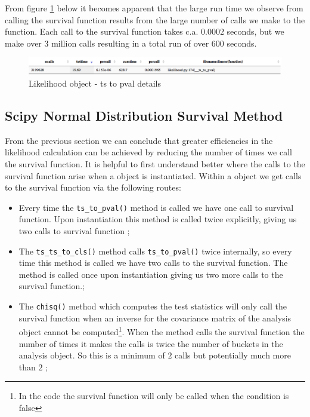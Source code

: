 From figure \ref{fig:ts_to_pval} below it becomes apparent that the large run time we observe from calling the survival function results from the large number of calls we make to the function. Each call to the survival function takes c.a. $0.0002$ seconds, but we make over $3$ million calls resulting in a total run of over $600$ seconds. 

\begin{figure}[H]
\centering
\includegraphics[scale=0.3]{plots/likelihood_count.png}
\caption{Likelihood object - ts to pval details}
\label{fig:ts_to_pval}
\end{figure}

\subsection{Scipy Normal Distribution Survival Method}
From the previous section we can conclude that greater efficiencies in the likelihood calculation can be achieved by reducing the number of times we call the survival function. It is helpful to first understand better where the calls to the survival function arise when a  object is instantiated. Within a  object we get calls to the survival function via the following routes:

\begin{itemize}
\item[1.] Every time the \texttt{ts\_to\_pval()} method is called we have one call to survival function. Upon instantiation this method is called twice explicitly, giving us two calls to survival function ;
\item[2.]The \texttt{ts\_ts\_to\_cls()} method calls \texttt{ts\_to\_pval()} twice internally, so every time this method is called we have two calls to the survival function. The method is called once upon instantiation giving us two more calls to the survival function.;
\item[3.] The \texttt{chisq()} method which computes the test statistics will only call the survival function when an inverse for the covariance matrix of the analysis object cannot be computed\footnote{In the code the survival function will only be called when the condition  is false}. When the method calls the survival function the number of times it makes the calls is twice the number of buckets in the analysis object. So this is a minimum of $2$ calls but potentially much more than $2$ ;
\end{itemize}

